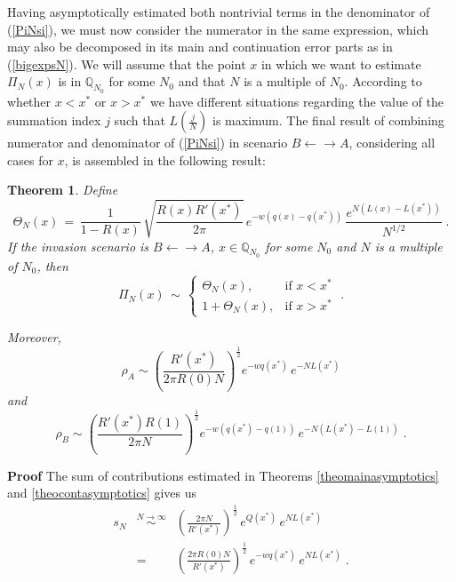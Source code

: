 \documentclass[12pt]{article}
\newtheorem{theorem}{Theorem}
\begin{document}
Having asymptotically estimated both nontrivial terms in the denominator of (\ref{PiNsi}), we must now consider the numerator in the same expression, which may also be decomposed in its main and continuation error parts as in (\ref{bigexpsN}). We will assume that the point $x$ in which we want to estimate $\Pi_N(x)$ is in $\mathbb{Q}_{N_0}$ for some $N_0$ and that $N$ is a multiple of $N_0$. According to whether $x<x^{\ast}$ or $x>x^{\ast}$ we have different situations regarding the value of the summation index $j$ such that $L(\frac{j}{N})$ is maximum. The final result of combining numerator and denominator of (\ref{PiNsi}) in scenario  $B\leftarrow \rightarrow A$, considering all cases for $x$, is assembled in the following result:
\begin{theorem}
	\label{theocompletecoord}
Define
\begin{equation}  \label{defTheta}
\Theta_N(x) \,=\, \frac{1}{1-R(x)} \, \sqrt{\frac{R(x) R'(x^{\ast})}{2\pi}} \, e^{-w(q(x)-q(x^{\ast}))}\, \frac{e^{N(L(x)-L(x^{\ast}))}}{N^{1/2}} \;.
\end{equation}
If the invasion scenario is $B\leftarrow \rightarrow A$, $x \in \mathbb{Q}_{N_0}$ for some $N_0$ and $N$ is a multiple of $N_0$, then
\begin{equation} \label{Picoord}
\Pi_N(x) \,\sim\, \begin{cases} \Theta_N(x), &\mbox{if } x< x^{\ast} \\ 
\displaystyle 1+ \Theta_N(x), & \mbox{if } x>x^{\ast} \end{cases}\;.
\end{equation}

Moreover,
\begin{equation}  \label{rhoAcoord}
\rho_A \sim \left(\frac{R'(x^{\ast})}{2 \pi R(0)  N}\right)^{\frac{1}{2}} e^{-wq(x^{\ast})} \, e^{-NL(x^{\ast})}
\end{equation}
and
\begin{equation}\label{rhoBcoord}
\rho_B \sim \left(\frac{R'(x^{\ast})R(1)}{2 \pi  N}\right)^{\frac{1}{2}} e^{-w(q(x^{\ast})-q(1))} \, e^{-N(L(x^{\ast})-L(1))}\;.
\end{equation}
\end{theorem}
\textbf{Proof}
The sum of contributions estimated in Theorems \ref{theomainasymptotics} and \ref{theocontasymptotics} gives us
\begin{eqnarray}
s_N &\stackrel{N \rightarrow \infty}{\sim} & \left(\frac{2\pi N}{R'(x^{\ast})}\right)^{\frac{1}{2}} \,e^{Q(x^{\ast})}\, e^{N L(x^{\ast})} \nonumber\\
&=& \left(\frac{2\pi R(0) N}{R'(x^{\ast})}\right)^{\frac{1}{2}} \,e^{-w q(x^{\ast})}\, e^{N L(x^{\ast})}
\;.\label{asympformsn}
\end{eqnarray}
\end{document}
